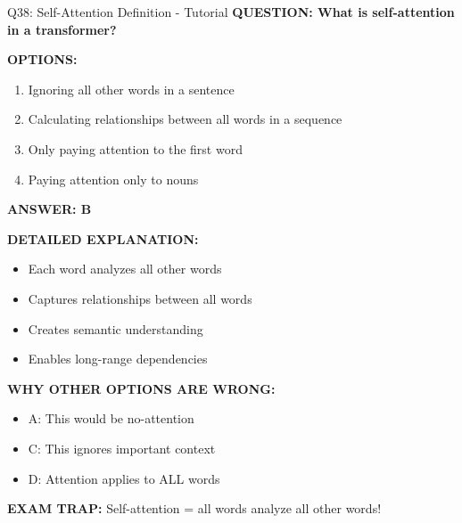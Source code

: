 \documentclass[8pt]{beamer}
\begin{document}
	\begin{frame}{Q38: Self-Attention Definition - Tutorial}
		\fontsize{6.5}{7.5}\selectfont
		\textbf{QUESTION: What is self-attention in a transformer?}
		
		\vspace{0.1cm}
		\textbf{OPTIONS:}
		\begin{enumerate}
			\item Ignoring all other words in a sentence
			\item Calculating relationships between all words in a sequence
			\item Only paying attention to the first word
			\item Paying attention only to nouns
		\end{enumerate}
		
		\vspace{0.1cm}
		\textcolor{myblue}{\textbf{ANSWER: B}}
		
		\vspace{0.1cm}
		\textbf{DETAILED EXPLANATION:}
		\begin{itemize}
			\item Each word analyzes all other words
			\item Captures relationships between all words
			\item Creates semantic understanding
			\item Enables long-range dependencies
		\end{itemize}
		
		\vspace{0.1cm}
		\textcolor{myred}{\textbf{WHY OTHER OPTIONS ARE WRONG:}}
		\begin{itemize}
			\item \textcolor{myred}{A:} This would be no-attention
			\item \textcolor{myred}{C:} This ignores important context
			\item \textcolor{myred}{D:} Attention applies to ALL words
		\end{itemize}
		
		\textcolor{myred}{\textbf{EXAM TRAP:}} Self-attention = \textcolor{myblue}{all words analyze all other words}!
	\end{frame}
	
\end{document}
